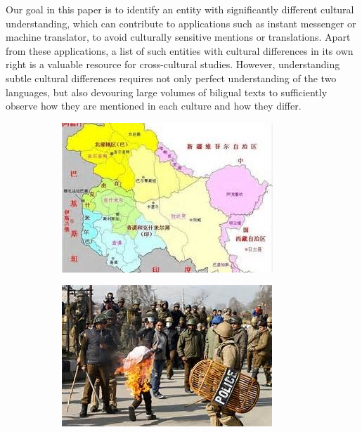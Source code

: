 Our goal in this paper is to identify an entity with significantly different
cultural understanding, which can contribute to applications such
as instant messenger or machine translator,
to avoid culturally sensitive mentions or translations.
Apart from these applications, a list of such entities with
cultural differences in its own right is a valuable resource for
cross-cultural studies.
However, understanding subtle cultural differences requires not
only perfect understanding of the two languages, but also devouring
large volumes of biligual texts to sufficiently observe how
they are mentioned in each culture and how they differ.
\begin{figure}[t]
	\vspace{10pt}
	\centering
	\begin{subfigure}{0.30\columnwidth}
		\centering
		\includegraphics[width=\columnwidth]{keshimier1.jpg}
	\end{subfigure}
	\begin{subfigure}{0.30\columnwidth}
		\centering
		\includegraphics[width=\columnwidth]{keshimier2.jpg}

\end{subfigure}
\end{figure}

